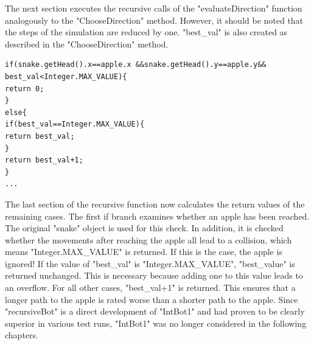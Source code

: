 \documentclass[a4paper,12pt]{article}
\begin{document}
The next section executes the recursive calls of the "evaluateDirection" function analogously to the
"ChooseDirection" method. However, it should be noted that the steps of the simulation are reduced by one. "best\_val" is also created as described in the "ChooseDirection" method.
\begin{verbatim}
if(snake.getHead().x==apple.x &&snake.getHead().y==apple.y&& best_val<Integer.MAX_VALUE){
return 0;
}
else{
if(best_val==Integer.MAX_VALUE){
return best_val;
}
return best_val+1;
}
...
\end{verbatim}
The last section of the recursive function now calculates the return values of the remaining cases.
The first if branch examines whether an apple has been reached. The original "snake" object is used
for this check. In addition, it is checked whether the movements after reaching the apple all lead to a
collision, which means "Integer.MAX\_VALUE" is returned. If this is the case, the apple is ignored!
If the value of "best\_val" is "Integer.MAX\_VALUE", "best\_value" is returned unchanged. This is
necessary because adding one to this value leads to an overflow.
For all other cases, "best\_val+1" is returned. This ensures that a longer path to the apple is rated
worse than a shorter path to the apple. Since "recursiveBot" is a direct development of "IntBot1" and had proven to be clearly superior in
various test runs, "IntBot1" was no longer considered in the following chapters.
\end{document}
